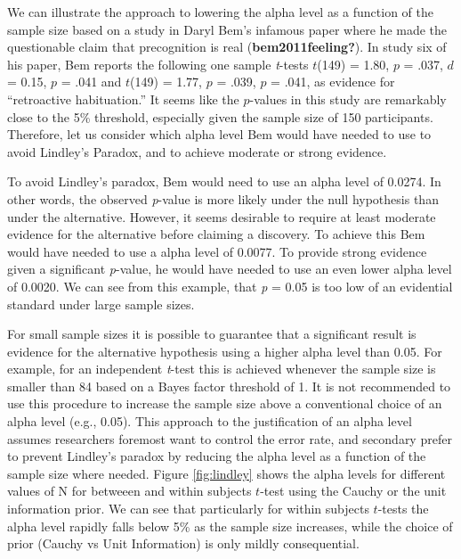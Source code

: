 \documentclass[
  english,
  ,jou, a4paper,floatsintext]{apa6}
\begin{document}
We can illustrate the approach to lowering the alpha level as a function of the sample size based on a study in Daryl Bem's infamous paper where he made the questionable claim that precognition is real (\textbf{bem2011feeling?}). In study six of his paper, Bem reports the following one sample \emph{t}-tests \(t\)(149) = 1.80, \(p\) = .037, \(d\) = 0.15, \(p\) = .041 and \(t\)(149) = 1.77, \(p\) = .039, \(p\) = .041, as evidence for ``retroactive habituation.'' It seems like the \(p\)-values in this study are remarkably close to the 5\% threshold, especially given the sample size of 150 participants. Therefore, let us consider which alpha level Bem would have needed to use to avoid Lindley's Paradox, and to achieve moderate or strong evidence.

To avoid Lindley's paradox, Bem would need to use an alpha level of 0.0274. In other words, the observed \emph{p}-value is more likely under the null hypothesis than under the alternative. However, it seems desirable to require at least moderate evidence for the alternative before claiming a discovery. To achieve this Bem would have needed to use a alpha level of 0.0077. To provide strong evidence given a significant \emph{p}-value, he would have needed to use an even lower alpha level of 0.0020. We can see from this example, that \emph{p} = 0.05 is too low of an evidential standard under large sample sizes.

For small sample sizes it is possible to guarantee that a significant result is evidence for the alternative hypothesis using a higher alpha level than 0.05. For example, for an independent \emph{t}-test this is achieved whenever the sample size is smaller than 84 based on a Bayes factor threshold of 1. It is not recommended to use this procedure to increase the sample size above a conventional choice of an alpha level (e.g., 0.05). This approach to the justification of an alpha level assumes researchers foremost want to control the error rate, and secondary prefer to prevent Lindley's paradox by reducing the alpha level as a function of the sample size where needed. Figure \ref{fig:lindley} shows the alpha levels for different values of N for betweeen and within subjects \(t\)-test using the Cauchy or the unit information prior. We can see that particularly for within subjects \(t\)-tests the alpha level rapidly falls below 5\% as the sample size increases, while the choice of prior (Cauchy vs Unit Information) is only mildly consequential.
\end{document}
